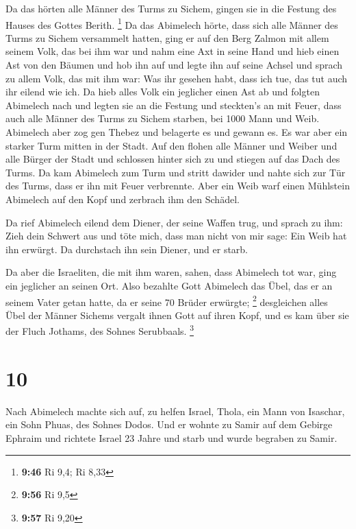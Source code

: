  Da das hörten alle Männer des Turms zu Sichem, gingen sie
in die Festung des Hauses des Gottes Berith. \footnote{\textbf{9:46} Ri
  9,4; Ri 8,33}  Da das Abimelech hörte, dass sich alle
Männer des Turms zu Sichem versammelt hatten,  ging er auf
den Berg Zalmon mit allem seinem Volk, das bei ihm war und nahm eine Axt
in seine Hand und hieb einen Ast von den Bäumen und hob ihn auf und
legte ihn auf seine Achsel und sprach zu allem Volk, das mit ihm war:
Was ihr gesehen habt, dass ich tue, das tut auch ihr eilend wie ich.
 Da hieb alles Volk ein jeglicher einen Ast ab und folgten
Abimelech nach und legten sie an die Festung und steckten's an mit
Feuer, dass auch alle Männer des Turms zu Sichem starben, bei 1000 Mann
und Weib.  Abimelech aber zog gen Thebez und belagerte es
und gewann es.  Es war aber ein starker Turm mitten in der
Stadt. Auf den flohen alle Männer und Weiber und alle Bürger der Stadt
und schlossen hinter sich zu und stiegen auf das Dach des Turms.
 Da kam Abimelech zum Turm und stritt dawider und nahte
sich zur Tür des Turms, dass er ihn mit Feuer verbrennte. 
Aber ein Weib warf einen Mühlstein Abimelech auf den Kopf und zerbrach
ihm den Schädel.

 Da rief Abimelech eilend dem Diener, der seine Waffen
trug, und sprach zu ihm: Zieh dein Schwert aus und töte mich, dass man
nicht von mir sage: Ein Weib hat ihn erwürgt. Da durchstach ihn sein
Diener, und er starb.

 Da aber die Israeliten, die mit ihm waren, sahen, dass
Abimelech tot war, ging ein jeglicher an seinen Ort.  Also
bezahlte Gott Abimelech das Übel, das er an seinem Vater getan hatte, da
er seine 70 Brüder erwürgte; \footnote{\textbf{9:56} Ri 9,5}
 desgleichen alles Übel der Männer Sichems vergalt ihnen
Gott auf ihren Kopf, und es kam über sie der Fluch Jothams, des Sohnes
Serubbaals. \footnote{\textbf{9:57} Ri 9,20}

\hypertarget{section-3}{%
\section{10}\label{section-3}}

 Nach Abimelech machte sich auf, zu helfen Israel, Thola,
ein Mann von Isaschar, ein Sohn Phuas, des Sohnes Dodos. Und er wohnte
zu Samir auf dem Gebirge Ephraim  und richtete Israel 23
Jahre und starb und wurde begraben zu Samir.

